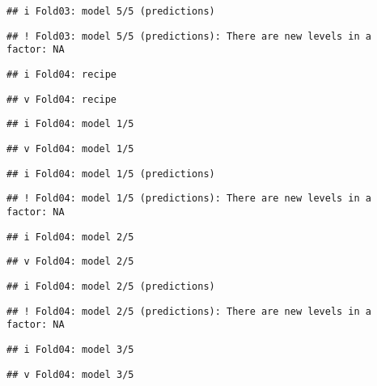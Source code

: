 \documentclass[
]{article}
\begin{document}
\begin{verbatim}
## i Fold03: model 5/5 (predictions)
\end{verbatim}

\begin{verbatim}
## ! Fold03: model 5/5 (predictions): There are new levels in a factor: NA
\end{verbatim}

\begin{verbatim}
## i Fold04: recipe
\end{verbatim}

\begin{verbatim}
## v Fold04: recipe
\end{verbatim}

\begin{verbatim}
## i Fold04: model 1/5
\end{verbatim}

\begin{verbatim}
## v Fold04: model 1/5
\end{verbatim}

\begin{verbatim}
## i Fold04: model 1/5 (predictions)
\end{verbatim}

\begin{verbatim}
## ! Fold04: model 1/5 (predictions): There are new levels in a factor: NA
\end{verbatim}

\begin{verbatim}
## i Fold04: model 2/5
\end{verbatim}

\begin{verbatim}
## v Fold04: model 2/5
\end{verbatim}

\begin{verbatim}
## i Fold04: model 2/5 (predictions)
\end{verbatim}

\begin{verbatim}
## ! Fold04: model 2/5 (predictions): There are new levels in a factor: NA
\end{verbatim}

\begin{verbatim}
## i Fold04: model 3/5
\end{verbatim}

\begin{verbatim}
## v Fold04: model 3/5
\end{verbatim}
\end{document}
